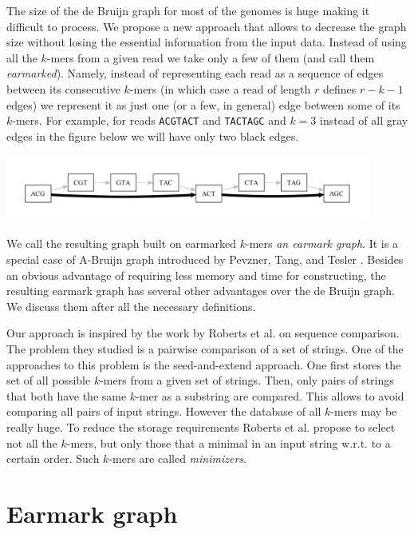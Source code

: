 \documentclass[12pt]{article}
\begin{document}
The size of the de Bruijn graph for most of the genomes is huge making
it difficult to process. 
We propose a new approach that allows to decrease
the graph size without losing the essential information from the input data.
Instead of using all the $k$-mers from a given read we take only a few of them
(and call them \emph{earmarked}).
Namely, instead 
of representing each read as a sequence of edges 
between its consecutive $k$-mers (in which case a read of length $r$ defines
$r-k-1$ edges) we represent it as just one (or a few, in general)
edge between some of its $k$-mers. For example, for 
reads {\tt ACGTACT} and {\tt TACTAGC} and $k=3$
instead of all gray edges in the figure below we will have 
only two black edges.
\begin{center}
\includegraphics[width=0.9\textwidth]{fig1.pdf}
\end{center}
We call the resulting graph built on earmarked $k$-mers \emph{an earmark graph}.
It is a special case of A-Bruijn graph introduced by Pevzner, Tang, and Tesler \cite{PTG04}.
Besides an obvious advantage of requiring less memory 
and time for constructing, the resulting earmark graph has several other advantages over the
de Bruijn graph. We discuss them after all the necessary definitions.

Our approach is inspired by the work by Roberts et al. \cite{RW04} on sequence comparison.
The problem they studied is a pairwise comparison of a set of strings. 
One of the approaches to this problem is the seed-and-extend approach.
One first stores the set of all possible $k$-mers from a given set of strings.
Then, only pairs of strings that both have the same $k$-mer as a substring are compared.
This allows to avoid comparing all pairs of input strings. However the database
of all $k$-mers may be really huge. To reduce the storage requirements Roberts et al. propose
to select not all the $k$-mers, but only those that a minimal in an input string w.r.t.
to a certain order. Such $k$-mers are called \emph{minimizers}.



\section{Earmark graph}
\end{document}
